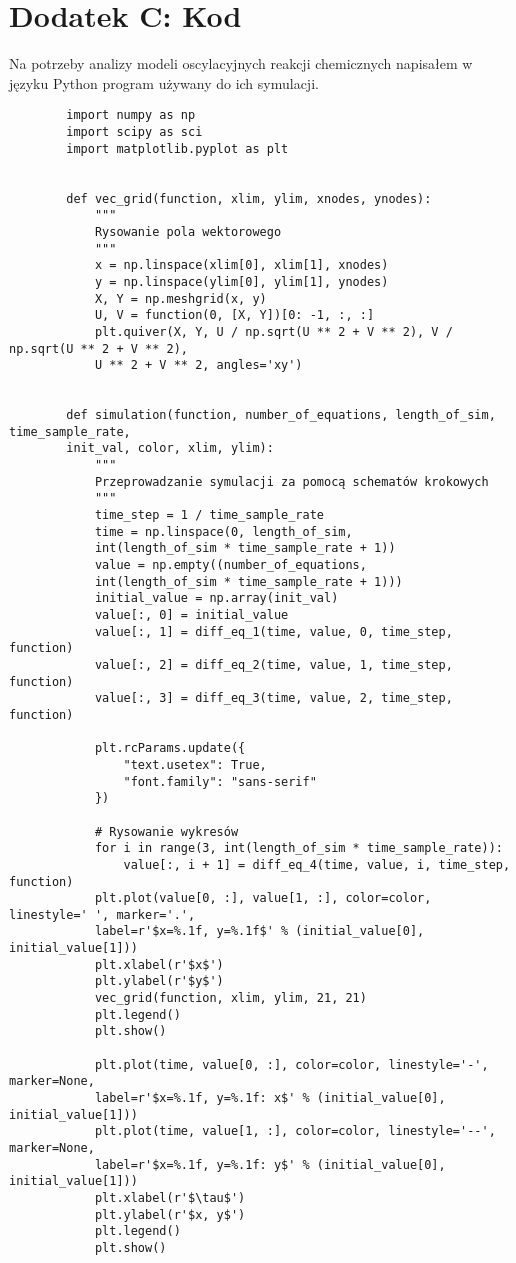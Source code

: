 \documentclass[10pt, a4paper, twoside, onecolumn]{article}
\numberwithin{equation}{section}
\begin{document}
	\section*{Dodatek C: Kod}\label{sec: dodatek C}
	Na potrzeby analizy modeli oscylacyjnych reakcji chemicznych napisałem w języku Python program używany do ich symulacji. 
	\begin{verbatim}
		import numpy as np
		import scipy as sci
		import matplotlib.pyplot as plt
		
		
		def vec_grid(function, xlim, ylim, xnodes, ynodes):
			"""
			Rysowanie pola wektorowego
			"""
		    x = np.linspace(xlim[0], xlim[1], xnodes)
		    y = np.linspace(ylim[0], ylim[1], ynodes)
		    X, Y = np.meshgrid(x, y)
		    U, V = function(0, [X, Y])[0: -1, :, :]
		    plt.quiver(X, Y, U / np.sqrt(U ** 2 + V ** 2), V / np.sqrt(U ** 2 + V ** 2), 
		    U ** 2 + V ** 2, angles='xy')
		
		
		def simulation(function, number_of_equations, length_of_sim, time_sample_rate, 
		init_val, color, xlim, ylim):
			"""
			Przeprowadzanie symulacji za pomocą schematów krokowych
			"""
		    time_step = 1 / time_sample_rate
		    time = np.linspace(0, length_of_sim, 
		    int(length_of_sim * time_sample_rate + 1))
		    value = np.empty((number_of_equations, 
		    int(length_of_sim * time_sample_rate + 1)))
		    initial_value = np.array(init_val)
		    value[:, 0] = initial_value
		    value[:, 1] = diff_eq_1(time, value, 0, time_step, function)
		    value[:, 2] = diff_eq_2(time, value, 1, time_step, function)
		    value[:, 3] = diff_eq_3(time, value, 2, time_step, function)
		
		    plt.rcParams.update({
		        "text.usetex": True,
		        "font.family": "sans-serif"
		    })
		
			# Rysowanie wykresów
		    for i in range(3, int(length_of_sim * time_sample_rate)):
		        value[:, i + 1] = diff_eq_4(time, value, i, time_step, function)
		    plt.plot(value[0, :], value[1, :], color=color, linestyle=' ', marker='.', 
		    label=r'$x=%.1f, y=%.1f$' % (initial_value[0], initial_value[1]))
		    plt.xlabel(r'$x$')
		    plt.ylabel(r'$y$')
		    vec_grid(function, xlim, ylim, 21, 21)
		    plt.legend()
		    plt.show()
		
		    plt.plot(time, value[0, :], color=color, linestyle='-', marker=None, 
		    label=r'$x=%.1f, y=%.1f: x$' % (initial_value[0], initial_value[1]))
		    plt.plot(time, value[1, :], color=color, linestyle='--', marker=None, 
		    label=r'$x=%.1f, y=%.1f: y$' % (initial_value[0], initial_value[1]))
		    plt.xlabel(r'$\tau$')
		    plt.ylabel(r'$x, y$')
		    plt.legend()
		    plt.show()
		

\end{verbatim}
\end{document}
